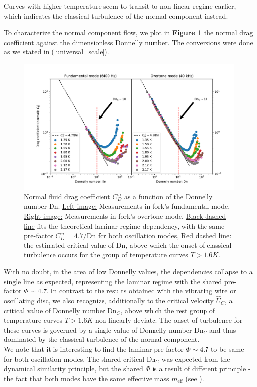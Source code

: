 Curves with higher temperature seem to transit to non-linear regime earlier, which indicates the classical turbulence of the normal component instead.

\newpage

To characterize the normal component flow, we plot in \textbf{Figure \ref{fork-drag_donnelly}} the normal drag coefficient against the dimensionless Donnelly number. The conversions were done as we stated in (\ref{universal_scale}).

\begin{figure}[h]
	\hspace{-1.7cm}
	\includegraphics[width=1.2\textwidth]{graphics/results/fork-drag_donnelly}
	\caption{Normal fluid drag coefficient $C_D^{\,n}$ as a function of the Donnelly number Dn. \underline{Left image:} Measurements in fork's fundamental mode, \underline{Right image:} Measurements in fork's overtone mode, \underline{Black dashed line} fits the theoretical laminar regime dependency, with the same pre-factor $C_D^{\,n} = 4.7 / \text{Dn}$ for both oscillation modes, \underline{Red dashed line:} the estimated critical value of Dn, above which the onset of classical turbulence occurs for the group of temperature curves $T > 1.6 \unit{K}$.}
	\label{fork-drag_donnelly}
\end{figure}

With no doubt, in the area of low Donnelly values, the dependencies collapse to a single line as expected, representing the laminar regime with the shared pre-factor $\Phi \sim 4.7$. In contrast to the results obtained with the vibrating wire or oscillating disc, we also recognize, additionally to the critical velocity $\hat{U}_C$, a critical value of Donnelly number $\text{Dn}_C$, above which the rest group of temperature curves $T > 1.6\unit{K}$ non-linearly deviate.
The onset of turbulence for these curves is governed by a single value of Donnelly number $\text{Dn}_C$ and thus dominated by the classical turbulence of the normal component.\\
We note that it is interesting to find the laminar pre-factor $\Phi \sim 4.7$ to be same for both oscillation modes. The shared critical $\text{Dn}_C$ was expected from the dynamical similarity principle, but the shared $\Phi$ is a result of different principle - the fact that both modes have the same effective mass $m_{\text{eff}}$ (see \cite{universal_scaling}).

